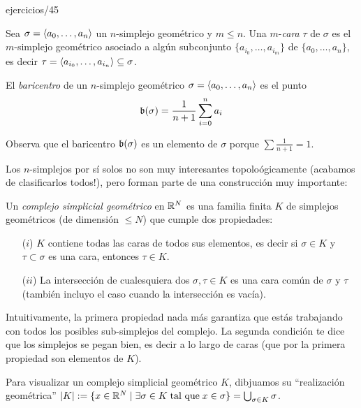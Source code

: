 \documentclass[../../topologia_algebraica]{subfiles}
\begin{document}
{ejercicios/45} %

\begin{defin}
  Sea $\sigma=\langle a_0,\ldots,a_n \rangle$ un $n$-simplejo geom\'etrico y $m\leq n$. Una $m$-\emph{cara} $\tau$
  de $\sigma$ es el $m$-simplejo geom\'etrico asociado a alg\'un subconjunto $\{a_{i_0},\ldots,a_{i_m}\}$
  de $\{a_0,\ldots,a_n\}$, es decir $\tau=\langle a_{i_0},\ldots,a_{i_n} \rangle\subseteq\sigma$.
\end{defin}

\begin{defin}
  El \emph{baricentro} de un $n$-simplejo geom\'etrico $\sigma=\langle a_0,\ldots,a_n \rangle$ es el punto
  \[
    \mathfrak{b}(\sigma)=\frac{1}{n+1}\sum_{i=0}^{n}a_i
  \]
\end{defin}
Observa que el baricentro $\mathfrak{b}(\sigma)$ es un elemento de $\sigma$ porque $\sum\tfrac{1}{n+1}=1$.

Los $n$-simplejos por s\'i solos no son muy interesantes topolo\'ogicamente (acabamos de clasificarlos
todos!), pero forman parte de una construcci\'on muy importante:

\begin{defin}
  Un \emph{complejo simplicial geom\'etrico} en $\mathbb{R}^N$ es una familia finita $K$ de simplejos
  geom\'etricos (de dimensi\'on $\leq N$) que cumple dos propiedades:
  \begin{enumerate}
  \item[($i$)] $K$ contiene todas las caras de todos sus elementos, es decir si $\sigma\in K$
    y $\tau\subset\sigma$ es una cara, entonces $\tau\in K$.
  \item[($ii$)] La intersecci\'on de cualesquiera dos $\sigma,\tau\in K$ es una cara com\'un de
    $\sigma$ y $\tau$ (tambi\'en incluyo el caso cuando la intersecci\'on es vac\'ia).
  \end{enumerate}
\end{defin}

Intuitivamente, la primera propiedad nada m\'as garantiza que est\'as trabajando con todos los
posibles sub-simplejos del complejo. La segunda condici\'on te dice que los simplejos se pegan
bien, es decir a lo largo de caras (que por la primera propiedad son elementos de $K$).

Para visualizar un complejo simplicial geom\'etrico $K$, dibjuamos su ``realizaci\'on geom\'etrica''
$\left| K \right|:=\{x\in\mathbb{R}^N\mid \exists\sigma\in K\;\text{tal que}\;x\in\sigma\}=\bigcup_{\sigma\in K}\sigma$.
\end{document}
